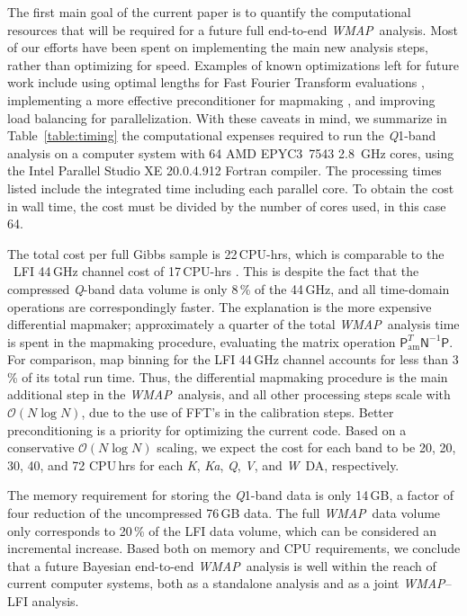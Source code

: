 \documentclass[twocolumn]{aa}
\def\WMAP{\emph{WMAP}}
\newcommand{\K}[0]{\textit K}
\newcommand{\Ka}[0]{\textit{Ka}}
\newcommand{\Q}[0]{\textit Q}
\newcommand{\V}[0]{\textit V}
\newcommand{\W}[0]{\textit W}
\begin{document}
The first main goal of the current paper is to quantify the computational
resources that will be required for a future full end-to-end \WMAP\ analysis.
Most of our efforts have been spent on implementing the main new analysis
steps, rather than optimizing for speed. Examples of known optimizations left
for future work include using optimal lengths for Fast Fourier Transform
evaluations \citep{bp03}, implementing a more effective preconditioner for
mapmaking \citep{bennett2012}, and improving load balancing for
parallelization.  With these caveats in mind, we summarize in
Table~\ref{table:timing} the computational expenses required to run the
\Q1-band analysis on a computer system with 64 AMD EPYC3~7543 2.8~GHz cores,
using the Intel Parallel Studio XE 20.0.4.912 Fortran compiler.  The processing
times listed include the integrated time including each parallel core. To
obtain the cost in wall time, the cost must be divided by the number of cores
used, in this case 64.

The total cost per full Gibbs sample is 22\,CPU\nobreakdash-hrs, which is
comparable to the \Planck\ LFI 44\,GHz channel cost of 17\,CPU\nobreakdash-hrs
\citep{bp03}. This is despite the fact that the compressed \Q-band data volume
is only 8\,\% of the 44\,GHz, and all time-domain operations are
correspondingly faster. The explanation is the more expensive differential
mapmaker; approximately a quarter of the total \WMAP\ analysis time is spent in the
mapmaking procedure, evaluating the matrix operation $\mathsf
P^T_\mathrm{am}\mathsf N^{-1}\mathsf P$. For comparison, map binning for the
LFI 44\,GHz channel accounts for less than 3\,\% of its total run time. Thus,
the differential mapmaking procedure is the main additional step in the \WMAP\
analysis, and all other processing steps scale with $\mathcal O(N\log N)$,
due to the use of FFT's in the calibration steps.  Better preconditioning is a
priority for optimizing the current code.  Based on a conservative $\mathcal
O(N\log N)$ scaling, we expect the cost for each band to be 20, 20, 30, 40, and
72 CPU\,hrs for each \K, \Ka, \Q, \V, and \W\ DA, respectively.

The memory requirement for storing the \Q1-band data is only 14\,GB, a factor
of four reduction of the uncompressed 76\,GB data. The full \WMAP\ data volume
only corresponds to 20\,\% of the LFI data volume, which can be considered an
incremental increase. Based both on memory and CPU requirements, we conclude
that a future Bayesian end-to-end \WMAP\ analysis is well within the reach of
current computer systems, both as a standalone analysis and as a joint
\WMAP--LFI analysis. 
\end{document}
